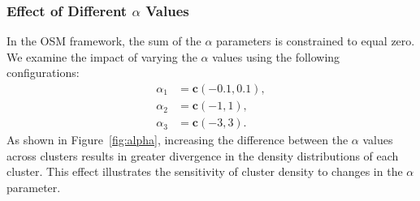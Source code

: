 \documentclass{article}
\begin{document}
\subsubsection*{Effect of Different $\alpha$ Values}
In the OSM framework, the sum of the $\alpha$ parameters is constrained to equal zero. 
We examine the impact of varying the $\alpha$ values using the following configurations:
\[
\begin{aligned}
\alpha_1 &= \mathbf{c}(-0.1, 0.1), \\
\alpha_2 &= \mathbf{c}(-1, 1), \\
\alpha_3 &= \mathbf{c}(-3, 3).
\end{aligned}
\]
As shown in Figure~\ref{fig:alpha}, increasing the difference between the $\alpha$ values across clusters results in greater divergence in the density distributions of each cluster. This effect illustrates the sensitivity of cluster density to changes in the $\alpha$ parameter.





\end{document}
